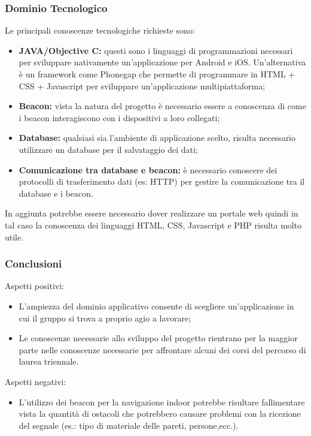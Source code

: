 \subsubsection{Dominio Tecnologico}
Le principali conoscenze tecnologiche richieste sono:

\begin{itemize}
	\item \textbf{JAVA/Objective C:} questi sono i linguaggi di programmazioni necessari per sviluppare nativamente un'applicazione per Android e iOS. Un'alternativa è un framework come Phonegap che 
	permette di programmare in HTML + CSS + Javascript per sviluppare un'applicazione multipiattaforma;
	\item \textbf{Beacon:} vista la natura del progetto è necessario essere a conoscenza di come i beacon interagiscono con i dispositivi a loro collegati;
	\item \textbf{Database:} qualsiasi sia l'ambiente di applicazione scelto, risulta necessario utilizzare un database per il salvataggio dei dati;
	\item \textbf{Comunicazione tra database e beacon:} è necessario conoscere dei protocolli di trasferimento dati (es: HTTP) per gestire la comunicazione tra il database e i beacon.
\end{itemize}

In aggiunta potrebbe essere necessario dover realizzare un portale web quindi in tal caso la conoscenza dei linguaggi HTML, CSS, Javascript e PHP risulta molto utile.


\subsubsection{Conclusioni}

Aspetti positivi:

\begin{itemize}
	\item L'ampiezza del dominio applicativo consente di scegliere un'applicazione in cui il gruppo si trova a proprio agio a lavorare;
	\item Le conoscenze necessarie allo sviluppo del progetto rientrano per la maggior parte nelle conoscenze necessarie per affrontare alcuni dei corsi
	del percorso di laurea triennale.
\end{itemize}

Aspetti negativi:

\begin{itemize}
	\item L'utilizzo dei beacon per la navigazione indoor potrebbe risultare fallimentare vista la quantità di ostacoli che potrebbero causare problemi con 
	la ricezione del segnale (es.: tipo di materiale delle pareti, persone,ecc.).
\end{itemize}